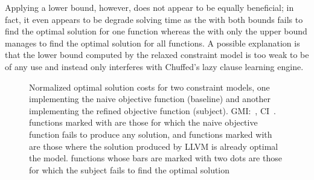 Applying a lower bound, however, does not appear to be equally beneficial; in
fact, it even appears to be degrade solving time as the  with both bounds fails to find the optimal \gls{solution} for one
\gls{function} whereas the  with only the upper bound
manages to find the optimal \gls{solution} for all \glspl{function}.
%
A possible explanation is that the lower bound computed by the relaxed
\gls{constraint model} is too weak to be of any use and instead only interferes
with \gls{Chuffed}'s \gls{lazy clause learning} engine.



\begin{figure}
  \centering%
  \maxsizebox{\textwidth}{!}{%
    \trimBarchartPlot{%
    }%
  }

  \caption[%
            Plot for evaluating the refined objective function's impact on
            code quality%
          ]%
          {%
            Normalized optimal solution costs for two constraint models, one
            implementing the naive objective function (baseline) and another
            implementing the refined objective function (subject).
            GMI:~\printGMI{%
              \ObjFunRefinedVsNaiveCyclesSpeedupRefinedVsNaiveWUbCyclesRegularSpeedupGmean%
            },
            CI~\printGMICI{%
              \ObjFunRefinedVsNaiveCyclesSpeedupRefinedVsNaiveWUbCyclesRegularSpeedupCiMin%
            }{%
              \ObjFunRefinedVsNaiveCyclesSpeedupRefinedVsNaiveWUbCyclesRegularSpeedupCiMax%
            }.
            \Glspl{function} marked with \barValueNoBaselineSolution{} are
            those for which the naive objective function fails to produce any
            solution, and \glspl{function} marked with \barValueNoSolution{} are
            those where the solution produced by \gls{LLVM} is already optimal
            \wrt the model.
            \Glspl{function} whose bars are marked with two dots are those
            for which the \gls{subject} fails to find the optimal solution%
          }
\end{figure}

